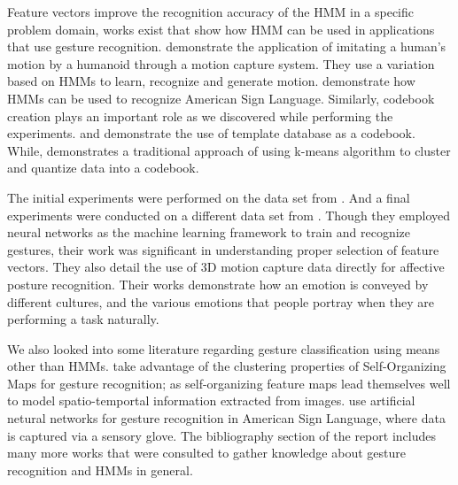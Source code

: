 \documentclass[]{report}   %
\begin{document}
Feature vectors improve the recognition accuracy of the HMM in a specific problem domain, works exist that show how HMM can be used in applications that use gesture recognition. \citet{4755984} demonstrate the application of imitating a human's motion by a humanoid through a motion capture system. They use a variation based on HMMs to learn, recognize and generate motion. \citet{Starner95visualrecognition} demonstrate how HMMs can be used to recognize American Sign Language. Similarly, codebook creation plays an important role as we discovered while performing the experiments. \citet{springerlink:10.1007/s00422-004-0516-0} and \citet{springerlink:10.1007/11492429_73} demonstrate the use of template database as a codebook. While, \citet{Yang_1994_329} demonstrates a traditional approach of using k-means algorithm to cluster and quantize data into a codebook.

The initial experiments were performed on the data set from \citet{Kleinsmith:2006:CDR:1221613.1222203}. And a final experiments were conducted on a different data set from \citet{KlEINSMITH_Bianchi-Berthouze_Steed_2011}. Though they employed neural networks as the machine learning framework to train and recognize gestures, their work was significant in understanding proper selection of feature vectors. They also detail the use of 3D motion capture data directly for affective posture recognition. Their works demonstrate how an emotion is conveyed by different cultures, and the various emotions that people portray when they are performing a task naturally. 

We also looked into some literature regarding gesture classification using means other than HMMs. \citet{Caridakis201052} take advantage of the clustering properties of Self-Organizing Maps for gesture recognition; as self-organizing feature maps lead themselves well to model spatio-temportal information extracted from images. \citet{Oz20111204} use artificial netural networks for gesture recognition in American Sign Language, where data is captured via a sensory glove. The bibliography section of the report includes many more works that were consulted to gather knowledge about gesture recognition and HMMs in general. 
\end{document}
